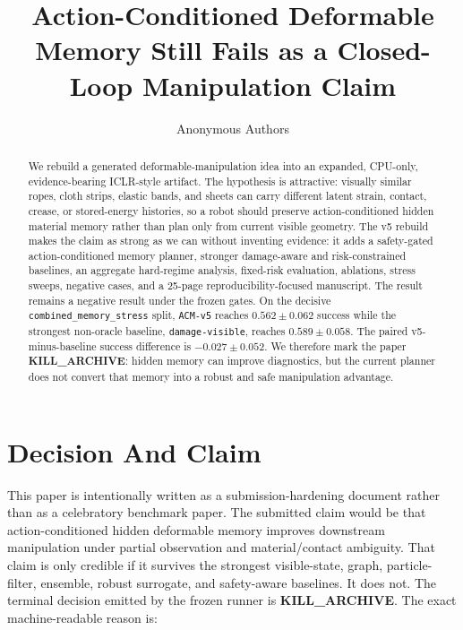\documentclass{article}
\title{Action-Conditioned Deformable Memory Still Fails as a Closed-Loop Manipulation Claim}
\author{Anonymous Authors}
\begin{document}
\maketitle

\begin{abstract}
We rebuild a generated deformable-manipulation idea into an expanded, CPU-only, evidence-bearing ICLR-style artifact. The hypothesis is attractive: visually similar ropes, cloth strips, elastic bands, and sheets can carry different latent strain, contact, crease, or stored-energy histories, so a robot should preserve action-conditioned hidden material memory rather than plan only from current visible geometry. The v5 rebuild makes the claim as strong as we can without inventing evidence: it adds a safety-gated action-conditioned memory planner, stronger damage-aware and risk-constrained baselines, an aggregate hard-regime analysis, fixed-risk evaluation, ablations, stress sweeps, negative cases, and a 25-page reproducibility-focused manuscript. The result remains a negative result under the frozen gates. On the decisive \texttt{combined\_memory\_stress} split, \texttt{ACM-v5} reaches $0.562 \pm 0.062$ success while the strongest non-oracle baseline, \texttt{damage-visible}, reaches $0.589 \pm 0.058$. The paired v5-minus-baseline success difference is $-0.027 \pm 0.052$. We therefore mark the paper \textbf{KILL\_ARCHIVE}: hidden memory can improve diagnostics, but the current planner does not convert that memory into a robust and safe manipulation advantage.
\end{abstract}

\section{Decision And Claim}
This paper is intentionally written as a submission-hardening document rather than as a celebratory benchmark paper. The submitted claim would be that action-conditioned hidden deformable memory improves downstream manipulation under partial observation and material/contact ambiguity. That claim is only credible if it survives the strongest visible-state, graph, particle-filter, ensemble, robust surrogate, and safety-aware baselines. It does not. The terminal decision emitted by the frozen runner is \textbf{KILL\_ARCHIVE}. The exact machine-readable reason is:
\end{document}

